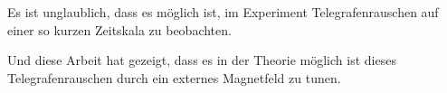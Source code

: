 \documentclass[main.tex]{subfiles}
\begin{document}
Es ist unglaublich, dass es möglich ist, im Experiment Telegrafenrauschen auf einer so kurzen Zeitskala zu beobachten. 

Und diese Arbeit hat gezeigt, dass es in der Theorie möglich ist dieses Telegrafenrauschen durch ein externes Magnetfeld zu tunen.
\end{document}
